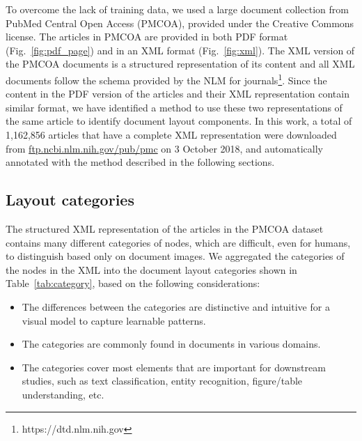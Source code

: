\documentclass[conference]{IEEEtran}
\begin{document}
To overcome the lack of training data, we used a large document collection from PubMed Central\textsuperscript{\texttrademark} Open Access (PMCOA), provided under the Creative Commons license. The articles in PMCOA are provided in both PDF format (Fig.~\ref{fig:pdf_page}) and in an XML format (Fig.~\ref{fig:xml}). The XML version of the PMCOA documents is a structured representation of its content and all XML documents follow the schema provided by the NLM for journals\footnote{https://dtd.nlm.nih.gov}. Since the content in the PDF version of the articles and their XML representation contain similar format, we have identified a method to use these two representations of the same article to identify document layout components. In this work, a total of 1,162,856 articles that have a complete XML representation were downloaded from \url{ftp.ncbi.nlm.nih.gov/pub/pmc} on 3 October 2018, and automatically annotated with the method described in the following sections.

\subsection{Layout categories}

The structured XML representation of the articles in the PMCOA dataset contains many different categories of nodes, which are difficult, even for humans, to distinguish based only on document images. We aggregated the categories of the nodes in the XML into the document layout categories shown in Table~\ref{tab:category}, based on the following considerations:
\begin{itemize}
  \item The differences between the categories are distinctive and intuitive for a visual model to capture learnable patterns.
  \item The categories are commonly found in documents in various domains.
  \item The categories cover most elements that are important for downstream studies, such as text classification, entity recognition, figure/table understanding, etc.
\end{itemize}
\end{document}
